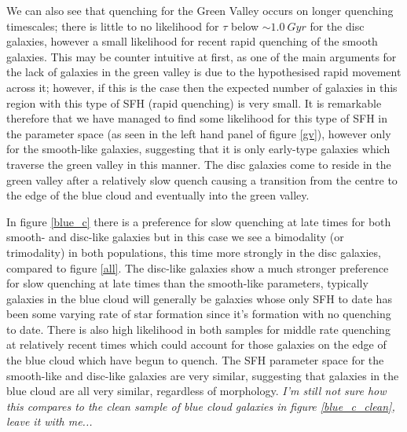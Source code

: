 \documentclass{mn2e}
\begin{document}
We can also see that quenching for the Green Valley occurs on longer quenching timescales; there is little to no likelihood for $\tau$ below $\sim 1.0 ~Gyr$ for the disc galaxies, however a small likelihood for recent rapid quenching of the smooth galaxies. This may be counter intuitive at first, as one of the main arguments for the lack of galaxies in the green valley is due to the hypothesised rapid movement across it; however, if this is the case then the expected number of galaxies in this region with this type of SFH (rapid quenching) is very small. It is remarkable therefore that we have managed to find some likelihood for this type of SFH in the parameter space (as seen in the left hand panel of figure \ref{gv}), however only for the smooth-like galaxies, suggesting that it is only early-type galaxies which traverse the green valley in this manner. The disc galaxies come to reside in the green valley after a relatively slow quench causing a transition from the centre to the edge of the blue cloud and eventually into the green valley. 

In figure \ref{blue_c} there is a preference for slow quenching at late times for both smooth- and disc-like galaxies but in this case we see a bimodality (or trimodality) in both populations, this time more strongly in the disc galaxies, compared to figure \ref{all}. The disc-like galaxies show a much stronger preference for slow quenching at late times than the smooth-like parameters, typically galaxies in the blue cloud will generally be galaxies whose only SFH to date has been some varying rate of star formation since it's formation with no quenching to date. There is also high likelihood in both samples for middle rate quenching at relatively recent times which could account for those galaxies on the edge of the blue cloud which have begun to quench. The SFH parameter space for the smooth-like and disc-like galaxies are very similar, suggesting that galaxies in the blue cloud are all very similar, regardless of morphology. \emph{I'm still not sure how this compares to the clean sample of blue cloud galaxies in figure \ref{blue_c_clean}, leave it with me...}
\end{document}
